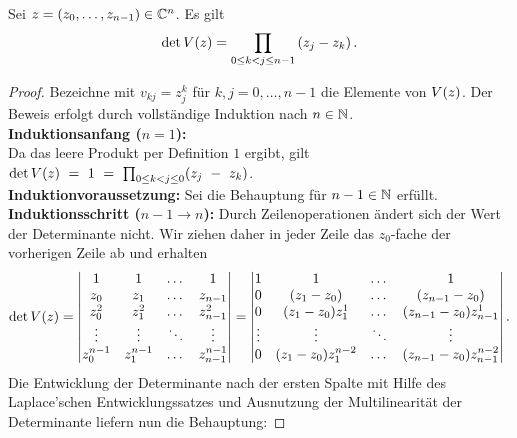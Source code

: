 \begin{lemma}
    Sei $z = (z_0, \dots, z_{n-1}) \in \mathbb{C}^n$.
    Es gilt
    \[
        \det V \! \left( z \right)
        = \prod_{0 \leq k < j \leq n-1} \left( z_j - z_k \right).
    \]
\end{lemma}

\begin{proof}
    Bezeichne mit $v_{kj} = z_j^k$ für $k,j = 0, \dots, n-1$ die Elemente von $V \! \left( z \right)$.
    Der Beweis erfolgt durch vollständige Induktion nach $n \in \mathbb{N}$.\\
    \textbf{Induktionsanfang (\boldmath $n=1$):}\\
    Da das leere Produkt per Definition $1$ ergibt, gilt
    $\det{V \! \left( z \right)}~=~1~=~\prod_{0 \leq k < j \leq 0} (z_j~-~z_k)$. \\[0.5em]
    \textbf{Induktionvoraussetzung:}
    Sei die Behauptung für $n-1 \in \mathbb{N}$ erfüllt.\\[0.5em]
    \textbf{Induktionsschritt (\boldmath $n\!-\!1 \rightarrow n$):}
    Durch Zeilenoperationen ändert sich der Wert der Determinante nicht.
    Wir ziehen daher in jeder Zeile das $z_0$-fache der vorherigen Zeile ab und
    erhalten
    \[
        \det{V \! \left( z \right)}
        = \begin{vmatrix}
            1         & 1         & \dots & 1 \\
            z_0       & z_1       & \dots & z_{n-1} \\
            z_0^2     & z_1^2     & \dots & z_{n-1}^2 \\
            \vdots    & \vdots    & \ddots & \vdots \\
            z_0^{n-1} & z_1^{n-1} & \dots & z_{n-1}^{n-1}
        \end{vmatrix}
        = \begin{vmatrix}
            1      & 1                  & \dots & 1 \\
            0      & (z_1-z_0)          & \dots & (z_{n-1}-z_0) \\
            0      & (z_1-z_0)z_1^1     & \dots & (z_{n-1}-z_0) z_{n-1}^1 \\
            \vdots & \vdots             & \ddots & \vdots \\
            0      & (z_1-z_0)z_1^{n-2} & \dots & (z_{n-1}-z_0) z_{n-1}^{n-2}
        \end{vmatrix}.
    \]
    Die Entwicklung der Determinante nach der ersten Spalte mit Hilfe des
    Laplace'schen Entwicklungssatzes und Ausnutzung der Multilinearität der
    Determinante liefern nun die Behauptung:

\end{proof}
